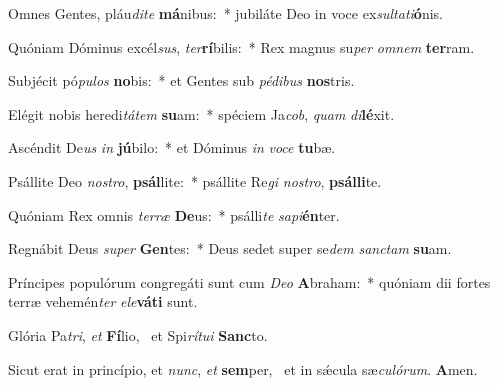 \item Omnes Gentes, pláu\textit{di}\textit{te} \textbf{má}nibus:~* jubiláte Deo in voce ex\textit{sul}\textit{ta}\textit{ti}\textbf{ó}nis.
\item Quóniam Dóminus excél\textit{sus}, \textit{ter}\textbf{rí}bilis:~* Rex magnus su\textit{per} \textit{om}\textit{nem} \textbf{ter}ram.
\item Subjécit pó\textit{pu}\textit{los} \textbf{no}bis:~* et Gentes sub \textit{pé}\textit{di}\textit{bus} \textbf{nos}tris.
\item Elégit nobis heredi\textit{tá}\textit{tem} \textbf{su}am:~* spéciem Ja\textit{cob}, \textit{quam} \textit{di}\textbf{lé}xit.
\item Ascéndit De\textit{us} \textit{in} \textbf{jú}bilo:~* et Dóminus \textit{in} \textit{vo}\textit{ce} \textbf{tu}bæ.
\item Psállite Deo \textit{nos}\textit{tro}, \textbf{psál}lite:~* psállite Re\textit{gi} \textit{nos}\textit{tro}, \textbf{psál}\textbf{li}te.
\item Quóniam Rex omnis \textit{ter}\textit{ræ} \textbf{De}us:~* psálli\textit{te} \textit{sa}\textit{pi}\textbf{én}ter.
\item Regnábit Deus \textit{su}\textit{per} \textbf{Gen}tes:~* Deus sedet super se\textit{dem} \textit{sanc}\textit{tam} \textbf{su}am.
\item Príncipes populórum congre\-gáti sunt cum \textit{De}\textit{o} \textbf{A}braham:~* quóniam dii fortes terræ vehemén\textit{ter} \textit{e}\textit{le}\textbf{vá}\textbf{ti} sunt.
\item Glória Pa\textit{tri}, \textit{et} \textbf{Fí}lio,~\psstar{} et Spi\textit{rí}\textit{tu}\textit{i} \textbf{Sanc}to.
\item Sicut erat in princípio, et \textit{nunc}, \textit{et} \textbf{sem}per,~\psstar{} et in sǽcula sæ\textit{cu}\textit{ló}\textit{rum}. \textbf{A}men.
